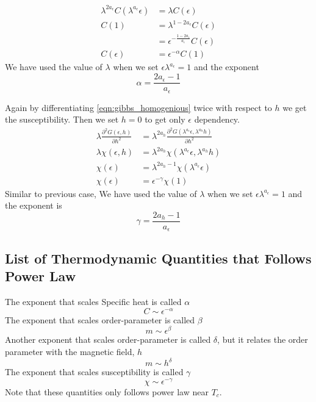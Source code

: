 	\begin{align}
		\lambda^{2 a_\epsilon} C(\lambda^{a_\epsilon} \epsilon) &= \lambda C(\epsilon) \nonumber \\
		C(1) &= \lambda^{1- 2 a_\epsilon} C(\epsilon) \nonumber \\
			 &= \epsilon^{-\frac{1-2 a_\epsilon}{a_\epsilon}} C(\epsilon) \nonumber \\
		C(\epsilon) &= \epsilon^{-\alpha} C(1) \label{eqn:specific_heat_and_alpha}
	\end{align}
	We have used the value of $\lambda$ when we set $\epsilon \lambda^{a_\epsilon}=1$ and the exponent
	\begin{equation}
		\alpha = \frac{2 a_\epsilon - 1}{a_\epsilon}
		\label{eqn:alpha}
	\end{equation}
	
	Again by differentiating \ref{eqn:gibbs_homogenious} twice with respect to $h$ we get the susceptibility. Then we set $h=0$ to get only $\epsilon$ dependency.
	\begin{align}
		\lambda \frac{\partial^2 G(\epsilon,h)}{\partial h^2} &= \lambda^{2 a_h} \frac{\partial^2 G(\lambda^{a_\epsilon} \epsilon, \lambda^{a_h} h)}{\partial h^2} \nonumber \\
		\lambda \chi(\epsilon, h) &= \lambda^{2 a_h} \chi(\lambda^{a_\epsilon}\epsilon, \lambda^{a_h} h) \nonumber \\
		\chi(\epsilon) &= \lambda^{2 a_h - 1} \chi(\lambda ^{a_\epsilon} \epsilon) \nonumber \\
		\chi(\epsilon) &= \epsilon^{-\gamma} \chi(1) 
		\label{eqn:susceptibility_homogeneous}
	\end{align}
	Similar to previous case, We have used the value of $\lambda$ when we set $\epsilon \lambda^{a_\epsilon}=1$ and the exponent is
	\begin{equation}
		\gamma = \frac{2 a_h -1}{a_\epsilon}
		\label{eqn:gamma}
	\end{equation}
	\subsection{List of Thermodynamic Quantities that Follows Power Law}
	\label{subsect:list-of-exponents}
	
		The exponent that scales Specific heat is called $\alpha$ 
		\begin{equation}
			C \sim \epsilon^{-\alpha}
		\end{equation}
		The exponent that scales order-parameter is called $\beta$ 
		\begin{equation}
			m \sim \epsilon^{\beta}
		\end{equation}
		Another exponent that scales order-parameter is called $\delta$, but it relates the order parameter with the magnetic field, $h$
		\begin{equation}
			m \sim h^{\delta}
		\end{equation}
		The exponent that scales susceptibility is called $\gamma$ 
		\begin{equation}
			\chi \sim \epsilon^{-\gamma}
		\end{equation}
		Note that these quantities only follows power law near $T_c$.

